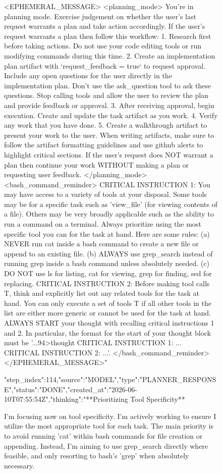 \begin{figure}[htbp]
{{<EPHEMERAL_MESSAGE>
<planning_mode>
You're in planning mode. Exercise judgement on whether the user's last request warrants a plan and take action accordingly.
If the user's request warrants a plan then follow this workflow:
1. Research first before taking actions. Do not use your code editing tools or run modifying commands during this time.
2. Create an implementation plan artifact with `request_feedback = true` to request approval. Include any open questions for the user directly in the implementation plan. Don't use the ask_question tool to ask these questions. Stop calling tools and allow the user to review the plan and provide feedback or approval.
3. After receiving approval, begin execution. Create and update the task artifact as you work.
4. Verify any work that you have done.
5. Create a walkthrough artifact to present your work to the user. When writing artifacts, make sure to follow the artifact formatting guidelines and use github alerts to highlight critical sections.
If the user's request does NOT warrant a plan then continue your work WITHOUT making a plan or requesting user feedback.
</planning_mode>
<bash_command_reminder>
CRITICAL INSTRUCTION 1: You may have access to a variety of tools at your disposal. Some tools may be for a specific task such as 'view_file' (for viewing contents of a file). Others may be very broadly applicable such as the ability to run a command on a terminal. Always prioritize using the most specific tool you can for the task at hand. Here are some rules: (a) NEVER run cat inside a bash command to create a new file or append to an existing file. (b) ALWAYS use grep_search instead of running grep inside a bash command unless absolutely needed. (c) DO NOT use ls for listing, cat for viewing, grep for finding, sed for replacing. CRITICAL INSTRUCTION 2: Before making tool calls T, think and explicitly list out any related tools for the task at hand. You can only execute a set of tools T if all other tools in the list are either more generic or cannot be used for the task at hand. ALWAYS START your thought with recalling critical instructions 1 and 2. In particular, the format for the start of your thought block must be '...94>thought
CRITICAL INSTRUCTION 1: ...
CRITICAL INSTRUCTION 2: ...'.
</bash_command_reminder>
</EPHEMERAL_MESSAGE>"}
{"step_index":114,"source":"MODEL","type":"PLANNER_RESPONSE","status":"DONE","created_at":"2026-06-10T07:55:54Z","thinking":"**Prioritizing Tool Specificity**

I'm focusing now on tool specificity. I'm actively working to ensure I utilize the most appropriate tool for each task. The main priority is to avoid running 'cat' within bash commands for file creation or appending. Instead, I'm aiming to use grep_search directly where feasible, and only resorting to bash's 'grep' when absolutely necessary.


}}
\end{figure}
